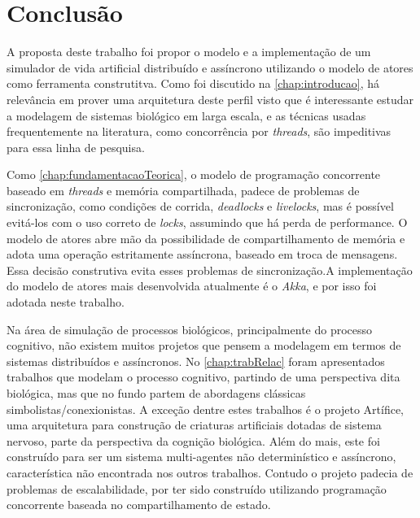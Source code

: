 


\chapter{Conclusão}
\label{chap:conclusao}

A proposta deste trabalho foi propor o modelo e a implementação de um simulador de vida artificial distribuído e assíncrono utilizando o modelo de atores como ferramenta construtitva. Como foi discutido na \autoref{chap:introducao}, há relevância em prover uma arquitetura deste perfil visto que é interessante estudar a modelagem de sistemas biológico em larga escala,  e as técnicas usadas frequentemente na literatura, como concorrência por \textit{threads}, são impeditivas para essa linha de pesquisa.

Como \autoref{chap:fundamentacaoTeorica}, o modelo de programação concorrente baseado em \textit{threads} e memória compartilhada, padece de problemas de sincronização, como condições de corrida, \mbox{\textit{deadlocks}} e \textit{livelocks}, mas é possível evitá-los com o uso correto de \textit{locks}, assumindo que há perda de performance. O modelo de atores abre mão da possibilidade de compartilhamento de memória e adota uma operação estritamente assíncrona, baseado em troca de mensagens. Essa decisão construtiva evita esses problemas de sincronização.A implementação do modelo de atores mais desenvolvida atualmente é o \textit{Akka}, e por isso foi adotada neste trabalho. 

Na área de simulação de processos biológicos, principalmente do processo cognitivo, não existem muitos projetos que pensem a modelagem em termos de sistemas distribuídos e assíncronos. No \autoref{chap:trabRelac} foram apresentados trabalhos que modelam o processo cognitivo, partindo de uma perspectiva dita biológica, mas que no fundo partem de abordagens clássicas simbolistas/conexionistas. A exceção dentre estes trabalhos é o projeto Artífice, uma arquitetura para construção de criaturas artificiais dotadas de sistema nervoso, parte da perspectiva da cognição biológica. Além do mais, este foi construído para ser um sistema multi-agentes não determinístico e assíncrono, característica não  encontrada nos outros trabalhos. Contudo o projeto padecia de problemas de escalabilidade, por ter sido construído utilizando programação concorrente baseada no compartilhamento de estado.

